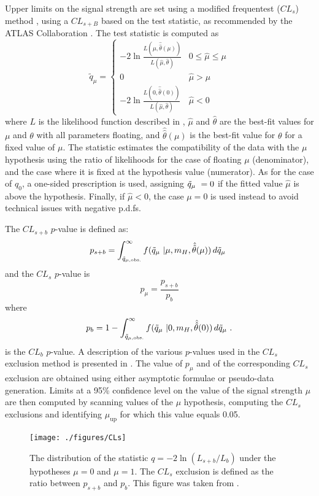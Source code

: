 Upper limits on the signal strength are set using a modified frequentest ($CL_s$)
method \cite{cls}, using a $CL_{s+B}$ based on the \qmu test statistic,
as recommended by the ATLAS Collaboration \cite{ATLAS_stat_recommendations}. 
The test statistic is computed as
\[
    \tilde q_{\mu} =
    \begin{cases}
        -2\ln{\frac{L(\mu,\hat{\hat\theta}(\mu))}{L(\hat\mu,\hat\theta)}} & 0 \le \hat\mu \le \mu \\
        0 & \hat\mu > \mu \\
        -2\ln{\frac{L(0,\hat{\hat\theta}(0))}{L(\hat\mu,\hat\theta)}} & \hat\mu < 0
    \end{cases}
\]
where $L$ is the likelihood function described in ,
$\hat\mu$ and $\hat\theta$ are the best-fit values for $\mu$ and $\theta$ with
all parameters floating, and $\hat{\hat\theta}(\mu)$ is the best-fit value for
$\theta$ for a fixed value of $\mu$. The statistic estimates the compatibility 
of the data with the $\mu$ hypothesis using the ratio of likelihoods for the case
of floating $\mu$ (denominator), and the case where it is fixed at the hypothesis
value (numerator). As for the case of $q_0$, a one-sided prescription is used,
assigning $\tilde q_{\mu}\  = 0$ if the fitted value $\hat\mu$ is above the hypothesis.
Finally, if $\hat\mu < 0$, the case $\mu=0$ is used instead to avoid technical
issues with negative p.d.fs.

The $CL_{s+b}$ $p$-value is defined as:
\[
    p_{s+b} = \int_{\tilde q_{\mu,\text{obs.}}}^{\infty} f(\tilde q_{\mu}\ |\mu,m_H,\hat{\hat\theta}(\mu))\,d\tilde q_{\mu}\ 
\]
and the $CL_s$ $p$-value is
\[
    p_{\mu} = \frac{p_{s+b}}{p_b}
\]
where
\[
    p_{b} = 1 - \int_{\tilde q_{\mu,\text{obs.}}}^{\infty} f(\tilde q_{\mu}\ |0,m_H,\hat{\hat\theta}(0))\,d\tilde q_{\mu}\ .
\]
is the $CL_b$ $p$-value. A description of the various $p$-values used in the $CL_s$
exclusion method is presented in .
The value of $p_{\mu}$ and of the corresponding $CL_s$ exclusion are obtained
using either asymptotic formulae \cite{Cowan:2010js} or pseudo-data generation.
Limits at a 95\% confidence level on the value of the signal strength $\mu$ are
then computed by scanning values of the $\mu$ hypothesis, computing the $CL_s$
exclusions and identifying $\mu_{\text{up}}$ for which this value equals 0.05.

\begin{figure}[htbp]
    \centering
    \texttt{[image: ./figures/CLs]}
    \caption{The distribution of the statistic $q = -2\ln(L_{s+b}/L_b)$ under the 
    hypotheses $\mu=0$ and $\mu=1$. The $CL_s$ exclusion is defined as the ratio
    between $p_{s+b}$ and $p_{b}$. This figure was taken from \cite{Cowan:2010js}.}
    \label{fig:cls}
\end{figure}

